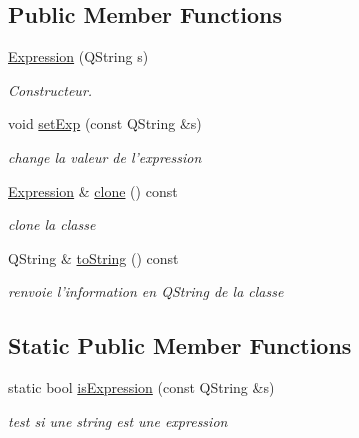 \subsection*{Public Member Functions}
\begin{DoxyCompactItemize}
\item 
\hyperlink{classNombre_1_1Expression_ab2b7ef803e791d6c91bcca2ee962176b}{Expression} (QString s)
\begin{DoxyCompactList}\small\item\em Constructeur. \item\end{DoxyCompactList}\item 
void \hyperlink{classNombre_1_1Expression_a8e3eec9d859922798be932da57e5ce6e}{setExp} (const QString \&s)
\begin{DoxyCompactList}\small\item\em change la valeur de l'expression \item\end{DoxyCompactList}\item 
\hypertarget{classNombre_1_1Expression_ae8744c7a385647a4759d9be743c983eb}{
\hyperlink{classNombre_1_1Expression}{Expression} \& \hyperlink{classNombre_1_1Expression_ae8744c7a385647a4759d9be743c983eb}{clone} () const }
\label{classNombre_1_1Expression_ae8744c7a385647a4759d9be743c983eb}

\begin{DoxyCompactList}\small\item\em clone la classe \item\end{DoxyCompactList}\item 
\hypertarget{classNombre_1_1Expression_ad8d1d96fbcb1f3041594efc10381bd34}{
QString \& \hyperlink{classNombre_1_1Expression_ad8d1d96fbcb1f3041594efc10381bd34}{toString} () const }
\label{classNombre_1_1Expression_ad8d1d96fbcb1f3041594efc10381bd34}

\begin{DoxyCompactList}\small\item\em renvoie l'information en QString de la classe \item\end{DoxyCompactList}\end{DoxyCompactItemize}
\subsection*{Static Public Member Functions}
\begin{DoxyCompactItemize}
\item 
static bool \hyperlink{classNombre_1_1Expression_a328706688b501e287257035d4eef3584}{isExpression} (const QString \&s)
\begin{DoxyCompactList}\small\item\em test si une string est une expression \item\end{DoxyCompactList}\end{DoxyCompactItemize}


